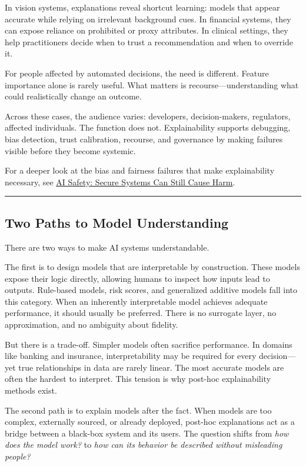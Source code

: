 \documentclass[
  letterpaper,
  DIV=11,
  numbers=noendperiod]{scrartcl}
\begin{document}
In vision systems, explanations reveal shortcut learning: models that
appear accurate while relying on irrelevant background cues. In
financial systems, they can expose reliance on prohibited or proxy
attributes. In clinical settings, they help practitioners decide when to
trust a recommendation and when to override it.

For people affected by automated decisions, the need is different.
Feature importance alone is rarely useful. What matters is
recourse---understanding what could realistically change an outcome.

Across these cases, the audience varies: developers, decision-makers,
regulators, affected individuals. The function does not. Explainability
supports debugging, bias detection, trust calibration, recourse, and
governance by making failures visible before they become systemic.

For a deeper look at the bias and fairness failures that make
explainability necessary, see
\href{https://changezakram.github.io/responsible-ai/ai-safety.html}{AI
Safety: Secure Systems Can Still Cause Harm}.

\begin{center}\rule{0.5\linewidth}{0.5pt}\end{center}

\subsection{Two Paths to Model
Understanding}\label{two-paths-to-model-understanding}

There are two ways to make AI systems understandable.

The first is to design models that are interpretable by construction.
These models expose their logic directly, allowing humans to inspect how
inputs lead to outputs. Rule-based models, risk scores, and generalized
additive models fall into this category. When an inherently
interpretable model achieves adequate performance, it should usually be
preferred. There is no surrogate layer, no approximation, and no
ambiguity about fidelity.

But there is a trade-off. Simpler models often sacrifice performance. In
domains like banking and insurance, interpretability may be required for
every decision---yet true relationships in data are rarely linear. The
most accurate models are often the hardest to interpret. This tension is
why post-hoc explainability methods exist.

The second path is to explain models after the fact. When models are too
complex, externally sourced, or already deployed, post-hoc explanations
act as a bridge between a black-box system and its users. The question
shifts from \emph{how does the model work?} to \emph{how can its
behavior be described without misleading people?}
\end{document}
